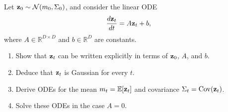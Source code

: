 \begin{exercise}
Let \({ \mathbf{z}}_0\sim \mathcal N(m_0,\Sigma_0)\), and consider the linear ODE
\[
\frac{d{ \mathbf{z}}_t}{dt}=A{ \mathbf{z}}_t+b,
\]
where \(A\in\mathbb{R}^{D\times D}\) and \(b\in\mathbb{R}^D\) are constants.

\begin{enumerate}
\item Show that \({ \mathbf{z}}_t\) can be written explicitly in terms of \({ \mathbf{z}}_0\), \(A\), and \(b\).
\item Deduce that \({ \mathbf{z}}_t\) is Gaussian for every \(t\).
\item Derive ODEs for the mean \(m_t=\mathbb E[{ \mathbf{z}}_t]\) and covariance \(\Sigma_t=\mathrm{Cov}({ \mathbf{z}}_t)\).
\item Solve these ODEs in the case \(A=0\).
\end{enumerate}
\end{exercise}
